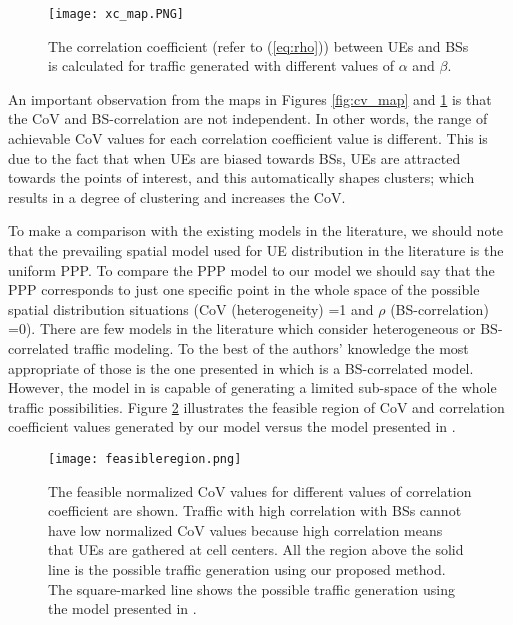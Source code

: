 \documentclass[journal]{IEEEtran}
\begin{document}
\begin{figure}
\centering
\texttt{[image: xc\_map.PNG]}
\caption{The correlation coefficient (refer to (\ref{eq:rho})) between UEs and BSs is calculated for traffic generated with different values of $\alpha$ and $\beta$.}
\label{fig:xc_map}
\end{figure}

An important observation from the maps in Figures \ref{fig:cv_map} and \ref{fig:xc_map} is that the CoV and BS-correlation are not independent. In other words, the range of achievable CoV values for each correlation coefficient value is different. This is due to the fact that when UEs are biased towards BSs, UEs are attracted towards the points of interest, and this automatically shapes clusters; which results in a degree of clustering and increases the CoV.

To make a comparison with the existing models in the literature, we should note that the prevailing spatial model used for UE distribution in the literature is the uniform PPP. To compare the PPP model to our model we should say that the PPP corresponds to just one specific point in the whole space of the possible spatial distribution situations (CoV (heterogeneity) =1 and $\rho$ (BS-correlation) =0). There are few models in the literature which consider heterogeneous or BS-correlated traffic modeling. To the best of the authors' knowledge the most appropriate of those is the one presented in \cite{dhillon2012modeling1} which is a BS-correlated model. However, the model in \cite{dhillon2012modeling1} is capable of generating a limited sub-space of the whole traffic possibilities. Figure \ref{fig:feasibleregion} illustrates the feasible region of CoV and correlation coefficient values generated by our model versus the model presented in \cite{dhillon2012modeling1}.

\begin{figure}
\centering
\texttt{[image: feasibleregion.png]}
\caption{The feasible normalized CoV values for different values of correlation coefficient are shown. Traffic with high correlation with BSs cannot have low normalized CoV values because high correlation means that UEs are gathered at cell centers. All the region above the solid line is the possible traffic generation using our proposed method. The square-marked line shows the possible traffic generation using the model presented in \cite{dhillon2012modeling1}.}
\label{fig:feasibleregion}
\end{figure}
\end{document}
